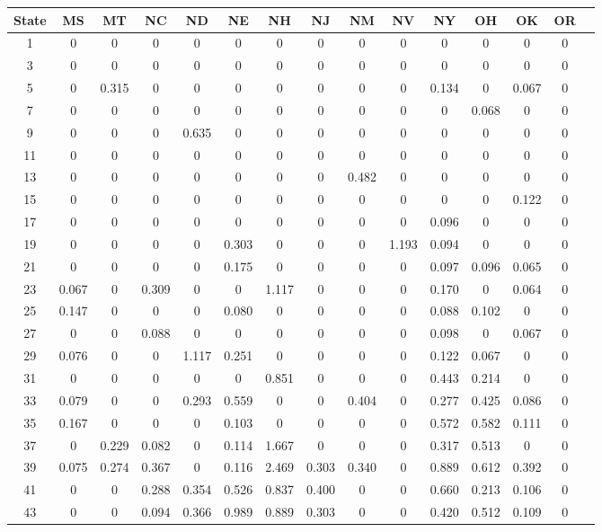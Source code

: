 \begin{table*}[htb]
\footnotesize
    \centering
    \begin{tabular}{|c |c |c |c |c |c |c |c |c |c |c |c |c |c |c|}\hline
        \textbf{State} & \textbf{MS}& \textbf{MT}& \textbf{NC}& \textbf{ND}& \textbf{NE}& \textbf{NH}& \textbf{NJ}& \textbf{NM}& \textbf{NV}& \textbf{NY}& \textbf{OH}& \textbf{OK}& \textbf{OR} \\\hline
    1&0& 0& 0& 0& 0& 0& 0& 0& 0& 0& 0& 0& 0\\\hline
3&0& 0& 0& 0& 0& 0& 0& 0& 0& 0& 0& 0& 0\\\hline
5&0& 0.315& 0& 0& 0& 0& 0& 0& 0& 0.134& 0& 0.067& 0\\\hline
7&0& 0& 0& 0& 0& 0& 0& 0& 0& 0& 0.068& 0& 0\\\hline
9&0& 0& 0& 0.635& 0& 0& 0& 0& 0& 0& 0& 0& 0\\\hline
11&0& 0& 0& 0& 0& 0& 0& 0& 0& 0& 0& 0& 0\\\hline
13&0& 0& 0& 0& 0& 0& 0& 0.482& 0& 0& 0& 0& 0\\\hline
15&0& 0& 0& 0& 0& 0& 0& 0& 0& 0& 0& 0.122& 0\\\hline
17&0& 0& 0& 0& 0& 0& 0& 0& 0& 0.096& 0& 0& 0\\\hline
19&0& 0& 0& 0& 0.303& 0& 0& 0& 1.193& 0.094& 0& 0& 0\\\hline
21&0& 0& 0& 0& 0.175& 0& 0& 0& 0& 0.097& 0.096& 0.065& 0\\\hline
23&0.067& 0& 0.309& 0& 0& 1.117& 0& 0& 0& 0.170& 0& 0.064& 0\\\hline
25&0.147& 0& 0& 0& 0.080& 0& 0& 0& 0& 0.088& 0.102& 0& 0\\\hline
27&0& 0& 0.088& 0& 0& 0& 0& 0& 0& 0.098& 0& 0.067& 0\\\hline
29&0.076& 0& 0& 1.117& 0.251& 0& 0& 0& 0& 0.122& 0.067& 0& 0\\\hline
31&0& 0& 0& 0& 0& 0.851& 0& 0& 0& 0.443& 0.214& 0& 0\\\hline
33&0.079& 0& 0& 0.293& 0.559& 0& 0& 0.404& 0& 0.277& 0.425& 0.086& 0\\\hline
35&0.167& 0& 0& 0& 0.103& 0& 0& 0& 0& 0.572& 0.582& 0.111& 0\\\hline
37&0& 0.229& 0.082& 0& 0.114& 1.667& 0& 0& 0& 0.317& 0.513& 0& 0\\\hline
39&0.075& 0.274& 0.367& 0& 0.116& 2.469& 0.303& 0.340& 0& 0.889& 0.612& 0.392& 0\\\hline
41&0& 0& 0.288& 0.354& 0.526& 0.837& 0.400& 0& 0& 0.660& 0.213& 0.106& 0\\\hline
43&0& 0& 0.094& 0.366& 0.989& 0.889& 0.303& 0& 0& 0.420& 0.512& 0.109& 0\\\hline

\end{tabular}
\end{table*}
